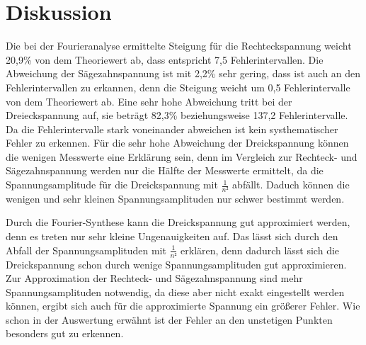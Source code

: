 \section{Diskussion}
Die bei der Fourieranalyse ermittelte Steigung für die Rechteckspannung
weicht 20,9\% von dem Theoriewert ab, dass entspricht 7,5 Fehlerintervallen.
Die Abweichung der Sägezahnspannung ist mit 2,2\% sehr gering, dass ist auch
an den Fehlerintervallen zu erkannen, denn die Steigung weicht um 0,5 Fehlerintervalle
von dem Theoriewert ab. Eine sehr hohe Abweichung tritt bei der Dreieckspannung
auf, sie beträgt 82,3\% beziehungsweise 137,2 Fehlerintervalle.
Da die Fehlerintervalle stark voneinander abweichen ist kein systhematischer
Fehler zu erkennen.
Für die sehr hohe Abweichung der Dreickspannung können die wenigen Messwerte
eine Erklärung sein, denn im Vergleich zur Rechteck- und Sägezahnspannung werden nur die Hälfte der
Messwerte ermittelt, da die Spannungsamplitude für die Dreickspannung mit $\frac{1}{n²}$ abfällt.
Daduch können die wenigen und sehr kleinen Spannungsamplituden nur schwer bestimmt werden.


Durch die Fourier-Synthese kann die Dreickspannung gut approximiert werden, denn
es treten nur sehr kleine Ungenauigkeiten auf. Das lässt sich durch den Abfall
der Spannungsamplituden mit $\frac{1}{n²}$ erklären, denn dadurch lässt sich die
Dreickspannung schon durch wenige Spannungsamplituden gut approximieren.
Zur Approximation der Rechteck- und Sägezahnspannung sind mehr
Spannungsamplituden notwendig, da diese aber nicht exakt eingestellt werden können,
ergibt sich auch für die approximierte Spannung ein größerer Fehler.
Wie schon in der Auswertung erwähnt ist der Fehler an den unstetigen Punkten
besonders gut zu erkennen.

\label{sec:Diskussion}
